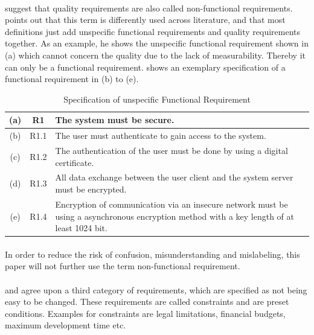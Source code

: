 \paragraph{} \textcite[cf.][15]{Lauesen.2008} suggest that quality requirements are also called non-functional requirements. \textcite[cf.][16-17]{Pohl.2007} points out that this term is differently used across literature, and that most definitions just add unspecific functional requirements and quality requirements together. As an example, he shows the unspecific functional requirement shown in  (a) which cannot concern the quality due to the lack of measurability. Thereby it can only be a functional requirement. \textcite[17]{Pohl.2007} shows an exemplary specification of a  functional requirement in  (b) to (e).

\begin{table}[H]
    \centering
    \begin{tabular}{|c|c|m{10cm}|}
        \hline
        (a) & R1 & The system  must be secure.\\
         \hline
        \hline
        (b) & R1.1 & The user must authenticate to gain access to the system.\\
        \hline
        (c) & R1.2 & The authentication of the user must be done by using a digital certificate.\\
        \hline
        (d) & R1.3 & All data exchange between the user client and the system server must be encrypted.\\
        \hline
        (e) & R1.4 & Encryption of communication via an insecure network must be using a asynchronous encryption method with a key length of at least 1024 bit.\\
        \hline
    \end{tabular}
    \caption[Specification of unspecific Functional Requirement]{Specification of unspecific Functional Requirement \parencite[17]{Pohl.2007}}
    \label{tab:reqSpec}
\end{table}

\paragraph{} In order to reduce the risk of confusion, misunderstanding and mislabeling, this paper will not further use the term non-functional requirement.
\paragraph{} \textcite[29]{Ebert.2014} and \textcite[18-19]{Pohl.2007} agree upon a third category of requirements, which are specified as not being easy to be changed. These requirements are called constraints and are preset conditions. Examples for constraints are legal limitations, financial budgets, maximum development time etc.
